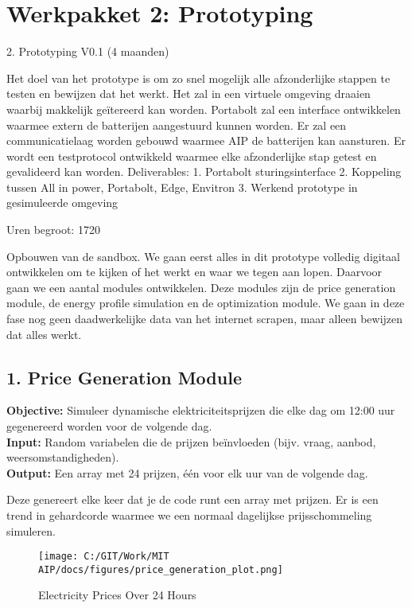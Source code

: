 \section{Werkpakket 2: Prototyping}
2. Prototyping V0.1 (4 maanden) 

Het doel van het prototype is om zo snel mogelijk alle afzonderlijke stappen te testen en bewijzen dat het werkt. Het zal in een virtuele omgeving draaien waarbij makkelijk geïtereerd kan worden. Portabolt zal een interface ontwikkelen waarmee extern de batterijen aangestuurd kunnen worden. Er zal een communicatielaag worden gebouwd waarmee AIP de batterijen kan aansturen. Er wordt een testprotocol ontwikkeld waarmee elke afzonderlijke stap getest en gevalideerd kan worden. 
Deliverables: 
1. Portabolt sturingsinterface 
2. Koppeling tussen All in power, Portabolt, Edge, Envitron 
3. Werkend prototype in gesimuleerde omgeving 

Uren begroot: 1720

Opbouwen van de sandbox. We gaan eerst alles in dit prototype volledig digitaal ontwikkelen om te kijken of het werkt en waar we tegen aan lopen. Daarvoor gaan we een aantal modules ontwikkelen. Deze modules zijn de price generation module, de energy profile simulation en de optimization module. We gaan in deze fase nog geen daadwerkelijke data van het internet scrapen, maar alleen bewijzen dat alles werkt.   

\subsection{1. Price Generation Module}
\textbf{Objective:} Simuleer dynamische elektriciteitsprijzen die elke dag om 12:00 uur gegenereerd worden voor de volgende dag. \\
\textbf{Input:} Random variabelen die de prijzen beïnvloeden (bijv. vraag, aanbod, weersomstandigheden). \\
\textbf{Output:} Een array met 24 prijzen, één voor elk uur van de volgende dag.

Deze genereert elke keer dat je de code runt een array met prijzen. Er is een trend in gehardcorde waarmee we een normaal dagelijkse prijsschommeling simuleren. 

\begin{figure}[h!]
  \centering
  \texttt{[image: C:/GIT/Work/MIT AIP/docs/figures/price\_generation\_plot.png]}
  \caption{Electricity Prices Over 24 Hours}
  \label{fig:price_plot}
\end{figure}

